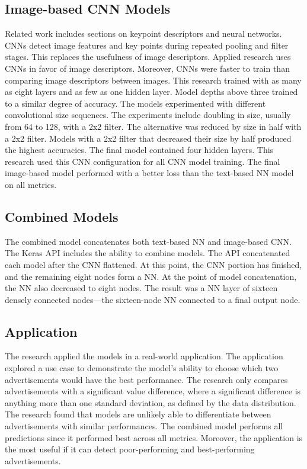 \documentclass{article}
\begin{document}
\subsection{Image-based CNN Models}
Related work includes sections on keypoint descriptors and neural networks. CNNs detect image features and key points during repeated pooling and filter stages.  This replaces the usefulness of image descriptors. Applied research uses CNNs in favor of image descriptors. Moreover, CNNs were faster to train than comparing image descriptors between images. This research trained with as many as eight layers and as few as one hidden layer. Model depths above three trained to a similar degree of accuracy. The models experimented with different convolutional size sequences. The experiments include doubling in size, usually from 64 to 128, with a 2x2 filter. The alternative was reduced by size in half with a 2x2 filter.  Models with a 2x2 filter that decreased their size by half produced the highest accuracies. The final model contained four hidden layers. This research used this CNN configuration for all CNN model training. The final image-based model performed with a better loss than the text-based NN model on all metrics.   

\subsection{Combined Models}
The combined model concatenates both text-based NN and image-based CNN. The Keras API includes the ability to combine models. The API concatenated each model after the CNN flattened. At this point, the CNN portion has finished, and the remaining eight nodes form a NN. At the point of model concatenation, the NN also decreased to eight nodes. The result was a NN layer of sixteen densely connected nodes—the sixteen-node NN connected to a final output node.    

\subsection{Application}
The research applied the models in a real-world application. The application explored a use case to demonstrate the model's ability to choose which two advertisements would have the best performance. The research only compares advertisements with a significant value difference, where a significant difference is anything more than one standard deviation, as defined by the data distribution. The research found that models are unlikely able to differentiate between advertisements with similar performances. The combined model performs all predictions since it performed best across all metrics. Moreover, the application is the most useful if it can detect poor-performing and best-performing advertisements.  
\end{document}
